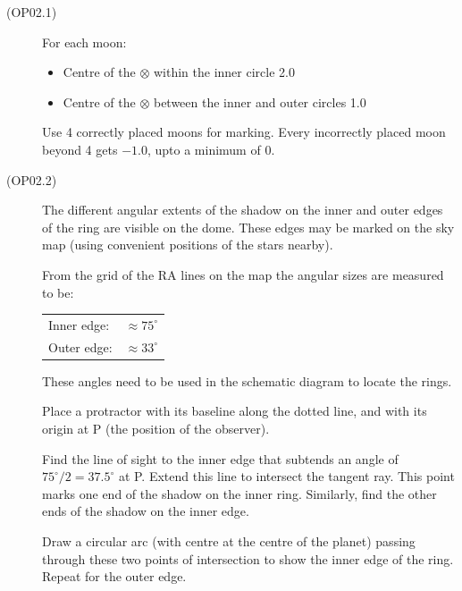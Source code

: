 \begin{description}
\item[(OP02.1)]
For each moon:
\begin{itemize}
\item Centre of the $\otimes$ within the inner circle \hfill 2.0
\item Centre of the $\otimes$ between the inner and outer circles \hfill 1.0
\end{itemize}
Use 4 correctly placed moons for marking. Every incorrectly placed moon beyond 4 gets
$-1.0$, upto a minimum of 0. %

\item[(OP02.2)]
The different angular extents of the shadow on the inner and outer edges of the ring are
visible on the dome. These edges may be marked on the sky map (using convenient positions
of the stars nearby).

From the grid of the RA lines on the map the angular sizes are measured to be:
\begin{center}
\begin{tabular}{ll}
Inner edge: & $\approx 75^\circ$\\
Outer edge: & $\approx 33^\circ$\\
\end{tabular}
\end{center}
These angles need to be used in the schematic diagram to locate the rings.

Place a protractor with its baseline along the dotted line, and with its origin at P (the
position of the observer).

Find the line of sight to the inner edge that subtends an angle of $75^\circ/2 = 37.5^\circ$
at P. Extend this line to intersect the tangent ray. This point marks one end of the shadow
on the inner ring. Similarly, find the other ends of the shadow on the inner edge.

Draw a circular arc (with centre at the centre of the planet) passing through these two
points of intersection to show the inner edge of the ring. Repeat for the outer edge.


\end{description}
